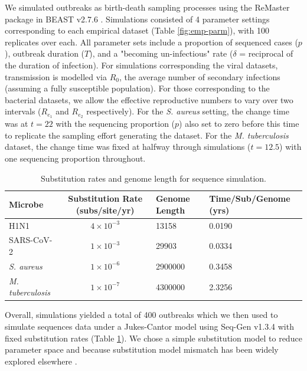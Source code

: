 \documentclass[11pt]{article}
\begin{document}
\begin{spacing}{1.5}
We simulated outbreaks as birth-death sampling processes using the ReMaster package in BEAST v2.7.6 \citep{vaughan_remaster_2024,bouckaert_beast_2019}. Simulations consisted of 4 parameter settings corresponding to each empirical dataset (Table \ref{fig:emp-parm}), with 100 replicates over each. All parameter sets include a proportion of sequenced cases ($p$), outbreak duration ($T$), and a "becoming un-infectious" rate ($\delta$ = reciprocal of the duration of infection). For simulations corresponding the viral datasets, transmission is modelled via $R_0$, the average number of secondary infections (assuming a fully susceptible population). For those corresponding to the bacterial datasets, we allow the effective reproductive numbers to vary over two intervals ($R_{e_1}$ and $R_{e_2}$ respectively). For the \textit{S. aureus} setting, the change time was at $t=22$ with the sequencing proportion ($p$) also set to zero before this time to replicate the sampling effort generating the dataset. For the \textit{M. tuberculosis} dataset, the change time was fixed at halfway through simulations ($t=12.5$) with one sequencing proportion throughout.

\begin{table}[H]
    \centering
    \caption{Substitution rates and genome length for sequence simulation.}
    \begin{tabular}{l|c|l|l}
    \hline
    Microbe                     &   Substitution Rate (subs/site/yr) & Genome Length & Time/Sub/Genome (yrs)  \\
    \hline
    H1N1                        & $4\times10^{-3}$ & 13158 & 0.0190\\
    SARS-CoV-2                  & $1\times10^{-3}$ & 29903 & 0.0334\\
    \textit{S. aureus}    & $1\times10^{-6}$ & 2900000  & 0.3458\\
    \textit{M. tuberculosis}    &   $1\times10^{-7}$ & 4300000 & 2.3256\\
    \hline
    \end{tabular}
    \label{tab:seq_parms}
\end{table}

Overall, simulations yielded a total of 400 outbreaks which we then used to simulate sequences data under a Jukes-Cantor model using Seq-Gen v1.3.4 \citep{rambaut_seq-gen_1997} with fixed substitution rates (Table \ref{tab:seq_parms}). We chose a simple substitution model to reduce parameter space and because substitution model mismatch has been widely explored elsewhere \citep{lemmon2004importance}.


\end{spacing}
\end{document}
